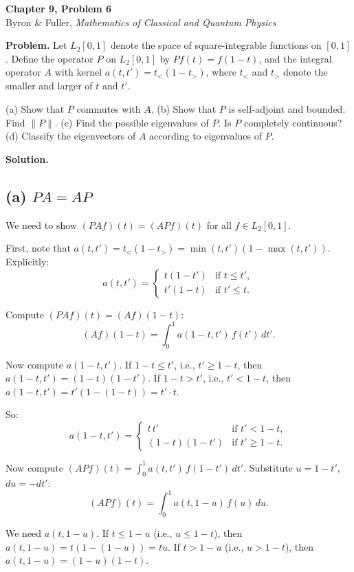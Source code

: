 \documentclass[12pt]{article}
\begin{document}
\begin{center}
{\Large\bfseries Chapter 9, Problem 6}\\[6pt]
Byron \& Fuller, \textit{Mathematics of Classical and Quantum Physics}
\end{center}

\bigskip

\textbf{Problem.} Let $L_2[0,1]$ denote the space of square-integrable functions on $[0,1]$. Define the operator $P$ on $L_2[0,1]$ by $Pf(t) = f(1-t)$, and the integral operator $A$ with kernel $a(t,t') = t_<(1-t_>)$, where $t_<$ and $t_>$ denote the smaller and larger of $t$ and $t'$.

(a) Show that $P$ commutes with $A$.
(b) Show that $P$ is self-adjoint and bounded. Find $\|P\|$.
(c) Find the possible eigenvalues of $P$. Is $P$ completely continuous?
(d) Classify the eigenvectors of $A$ according to eigenvalues of $P$.

\bigskip
\textbf{Solution.}

\subsection*{(a) $PA = AP$}

We need to show $(PAf)(t) = (APf)(t)$ for all $f \in L_2[0,1]$.

First, note that $a(t,t') = t_<(1-t_>) = \min(t,t')(1-\max(t,t'))$. Explicitly:
\[
a(t,t') = \begin{cases} t(1-t') & \text{if } t \le t', \\ t'(1-t) & \text{if } t' \le t. \end{cases}
\]

Compute $(PAf)(t) = (Af)(1-t)$:
\[
(Af)(1-t) = \int_0^1 a(1-t, t')\,f(t')\,dt'.
\]

Now compute $a(1-t, t')$. If $1-t \le t'$, i.e., $t' \ge 1-t$, then $a(1-t,t') = (1-t)(1-t')$. If $1-t > t'$, i.e., $t' < 1-t$, then $a(1-t,t') = t'(1-(1-t)) = t'\cdot t$.

So:
\[
a(1-t, t') = \begin{cases} t\,t' & \text{if } t' < 1-t, \\ (1-t)(1-t') & \text{if } t' \ge 1-t. \end{cases}
\]

Now compute $(APf)(t) = \int_0^1 a(t,t')\,f(1-t')\,dt'$. Substitute $u = 1-t'$, $du = -dt'$:
\[
(APf)(t) = \int_0^1 a(t, 1-u)\,f(u)\,du.
\]

We need $a(t, 1-u)$. If $t \le 1-u$ (i.e., $u \le 1-t$), then $a(t,1-u) = t(1-(1-u)) = tu$. If $t > 1-u$ (i.e., $u > 1-t$), then $a(t,1-u) = (1-u)(1-t)$.
\end{document}
